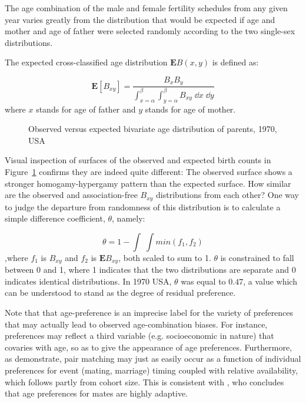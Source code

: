 
The age combination of the male and female fertility schedules from
any given year varies greatly from the distribution that would be expected if
age and mother and age of father were selected randomly according to the two
single-sex distributions.

The expected cross-classified age distribution $\textbf{E}B(x,y)$ is defined as:

\begin{equation}
\label{eq:expected}
\textbf{E}\left[B_{xy}\right] = \frac{B_x B_y}{\int _{x = \alpha} ^\beta \int
_{y = \alpha} ^\beta B_{xy} \; \dd x \;\dd y}
\end{equation}
where $x$ stands for age of father and $y$ stands for age of mother.

\begin{figure}[ht!]
        \centering  
          \caption{Observed versus expected bivariate age distribution of
          parents, 1970, USA}
          \label{fig:US1970obsexp}
\end{figure}


Visual inspection of surfaces of the observed and expected birth counts in
Figure~\ref{fig:US1970obsexp} confirms they are indeed quite different: The
observed surface shows a stronger homogamy-hypergamy pattern than the expected surface. How similar are the
observed and association-free $B_{xy}$ distributions from each other? One way to
judge the departure from randomness of this distribution is to calculate a
simple difference coefficient, $\theta$, namely:

\begin{equation}
\label{eq:coefdiff}
\theta = 1 - \int \;\int min(f_1, f_2)
\end{equation}
,where $f_1$ is $B_{xy}$ and $f_2$ is $\textbf{E}B_{xy}$, both scaled to sum to
1. $\theta$ is constrained to fall between 0 and 1, where 1 indicates that the
two distributions are separate and 0 indicates identical distributions. In 1970 USA,
$\theta$ was equal to $0.47$, a value which can be understood to stand as the
degree of residual preference.

Note that that age-preference is an imprecise label for the variety
of preferences that may actually lead to observed age-combination biases. For
instance, preferences may reflect a third variable (e.g. socioeconomic
in nature) that covaries with age, so as to give the appearance of age
preferences. Furthermore, as \citet{bergstrom1994sweden}
demonstrate, pair matching may just as easily occur as a function of individual
preferences for event (mating, marriage) timing coupled with relative
availability, which follows partly from cohort size. This is consistent with
\citet{bhrolchain2001flexibility}, who concludes that age preferences for
mates are highly adaptive.

